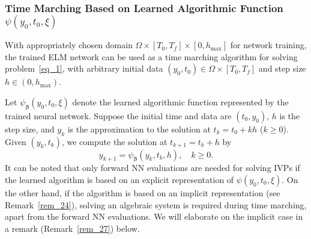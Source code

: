


\subsubsection{Time Marching Based on Learned Algorithmic Function $\psi(y_0,t_0,\xi)$}
\label{sec_224}

%
%
%


With appropriately chosen domain $\Omega\times[T_0,T_f]\times[0,h_{\max}]$
for network training,
the trained ELM network can be used as a time marching algorithm
for solving problem~\eqref{eq_1}, with arbitrary initial data
$(y_0,t_0)\in\Omega\times[T_0,T_f]$ and step size $h\in(0,h_{\max})$.

Let $\psi_{\bm\beta}(y_0,t_0,\xi)$ denote the learned algorithmic function
represented by the trained neural network.
Suppose the initial time and data
are $(t_0,y_0)$, $h$ is the step size, and $y_k$ is the approximation to
the solution at $t_k=t_0+kh$ ($k\geqslant 0$).
Given $(y_k,t_k)$, we compute the  solution at $t_{k+1}=t_k+h$
by
\begin{equation}\label{eq_27}
  y_{k+1} = \psi_{\bm\beta}(y_k,t_k,h), \quad k\geqslant 0.
\end{equation}
It can be noted that only forward NN evaluations 
are needed for solving IVPs if the learned algorithm is based on
an explicit representation of $\psi(y_0,t_0,\xi)$.
On the other hand, if the algorithm
is based on an implicit representation (see Remark~\ref{rem_24}),
solving an algebraic system
is required during time marching, apart from the forward NN evaluations.
We will elaborate on the implicit case in a remark (Remark~\ref{rem_27})
below.



